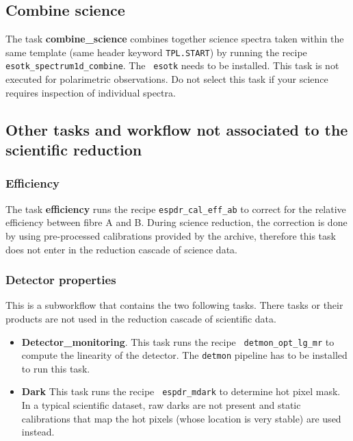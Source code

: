 \subsection{Combine science}
The task {\bf combine\_science} combines together science spectra
taken within the same template (same header keyword {\tt TPL.START})
by running the recipe {\tt esotk\_spectrum1d\_combine}. The {\tt
  esotk} needs to be installed. This task is not executed for
polarimetric observations.  Do not select this task if your science
requires inspection of individual spectra.

\subsection{Other tasks and workflow not associated to the scientific reduction}

\subsubsection{Efficiency}

The task {\bf efficiency} runs the recipe {\tt espdr\_cal\_eff\_ab} to
correct for the relative efficiency between fibre A and B. During
science reduction, the correction is done by using pre-processed
calibrations provided by the archive, therefore this task does not
enter in the reduction cascade of science data.

\subsubsection{Detector properties}
This is a subworkflow that contains the two following tasks. There tasks or their products are not used in the reduction cascade of scientific data.
\begin{itemize}

\item {\bf Detector\_monitoring}. This task runs the recipe {\tt
  detmon\_opt\_lg\_mr} to compute the linearity of the detector. The
  {\tt detmon} pipeline has to be installed to run this task. 

\item{\bf Dark} This task runs the recipe {\tt
  espdr\_mdark} to determine hot pixel mask. In a typical scientific
  dataset, raw darks are not present and static calibrations that map
  the hot pixels (whose location is very stable) are used instead.
\end{itemize}
